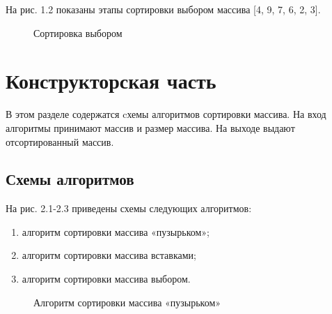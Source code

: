 \documentclass[12pt]{report}
\begin{document}
На рис. 1.2 показаны этапы сортировки выбором массива [4, 9, 7,
6, 2, 3].
\newpage
\begin{figure}[h]
	\caption{Сортировка выбором}
	\label{figure:image}
\end{figure}

\chapter{Конструкторская часть}
В этом разделе содержатся cхемы алгоритмов сортировки массива.
На вход алгоритмы принимают массив и размер массива. На выходе выдают отсортированный массив.\vspace{\baselineskip}
	
\section{Схемы алгоритмов}
На рис. 2.1-2.3 приведены схемы следующих алгоритмов:
\begin{enumerate}
	\item алгоритм сортировки массива «пузырьком»;
	\item алгоритм сортировки массива вставками;
	\item алгоритм сортировки массива выбором.
\end{enumerate}

\newpage
\begin{figure}[h]
	\caption{Алгоритм сортировки массива «пузырьком»}
	\label{figure:image}
\end{figure}
\end{document}
